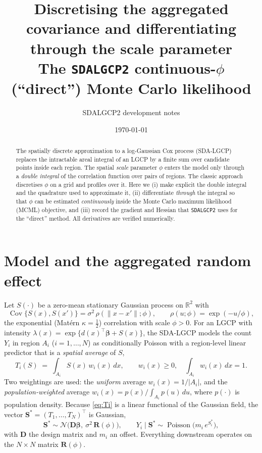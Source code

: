 \documentclass[11pt]{article}
\title{\textbf{Discretising the aggregated covariance and differentiating through
the scale parameter}\\[4pt]
\large The \texttt{SDALGCP2} continuous-$\phi$ (``direct'') Monte Carlo likelihood}
\author{SDALGCP2 development notes}
\date{\today}
\newcommand{\R}{\mathbf{R}}
\newcommand{\D}{\mathbf{D}}
\newcommand{\Sv}{\mathbf{S}}
\newcommand{\bet}{\bm{\beta}}
\newcommand{\Ai}{A_i}
\begin{document}
\maketitle

\begin{abstract}
The spatially discrete approximation to a log-Gaussian Cox process (SDA-LGCP)
replaces the intractable areal integral of an LGCP by a finite sum over candidate
points inside each region. The spatial \emph{scale} parameter $\phi$ enters the
model only through a \emph{double integral} of the correlation function over pairs
of regions. The classic approach discretises $\phi$ on a grid and profiles
over it. Here we (i) make explicit the double integral and the quadrature used to
approximate it, (ii) differentiate \emph{through} the integral so that $\phi$ can
be estimated \emph{continuously} inside the Monte Carlo maximum likelihood (MCML)
objective, and (iii) record the gradient and Hessian that \texttt{SDALGCP2} uses
for the ``direct'' method. All derivatives are verified numerically.
\end{abstract}

\section{Model and the aggregated random effect}

Let $S(\cdot)$ be a zero-mean stationary Gaussian process on $\mathbb{R}^2$ with
\begin{equation}
\operatorname{Cov}\{S(x),S(x')\} = \sigma^2\,\rho(\|x-x'\|;\phi),
\qquad \rho(u;\phi)=\exp(-u/\phi),
\label{eq:gp}
\end{equation}
the exponential (Mat\'ern $\kappa=\tfrac12$) correlation with scale $\phi>0$.
For an LGCP with intensity $\lambda(x)=\exp\{d(x)^\top\bet + S(x)\}$, the SDA-LGCP
models the count $Y_i$ in region $\Ai$ ($i=1,\dots,N$) as conditionally Poisson
with a region-level linear predictor that is a \emph{spatial average} of $S$,
\begin{equation}
T_i(S) \;=\; \int_{\Ai} S(x)\,w_i(x)\,dx,
\qquad w_i(x)\ge 0,\quad \int_{\Ai} w_i(x)\,dx = 1 .
\label{eq:Ti}
\end{equation}
Two weightings are used: the \emph{uniform} average $w_i(x)=1/|\Ai|$, and the
\emph{population-weighted} average $w_i(x)=p(x)\big/\!\int_{\Ai}p(u)\,du$, where
$p(\cdot)$ is population density. Because \eqref{eq:Ti} is a linear functional of
the Gaussian field, the vector $\Sv^\ast=(T_1,\dots,T_N)^\top$ is Gaussian,
\begin{equation}
\Sv^\ast \sim \mathcal{N}\!\big(\D\bet,\ \sigma^2\,\R(\phi)\big),
\qquad Y_i\mid \Sv^\ast \sim \operatorname{Poisson}\!\big(m_i\,e^{S^\ast_i}\big),
\label{eq:model}
\end{equation}
with $\D$ the design matrix and $m_i$ an offset. Everything downstream operates on
the $N\times N$ matrix $\R(\phi)$.
\end{document}
